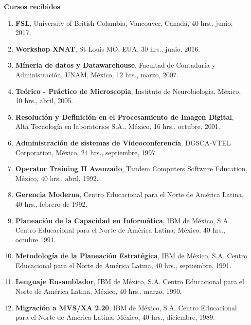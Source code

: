 \documentclass[11pt]{article}
\begin{document}
\textbf{\color{red} Cursos recibidos}

\begin{enumerate}
\item \textbf{FSL}, University of British Columbia, Vancouver, Canadá, 40 hrs., junio, 2017. 

\item \textbf{Workshop XNAT}, St Louis MO, EUA, 30 hrs., junio, 2016. 

\item \textbf{Míneria de datos y Datawarehouse}, Facultad de Contaduría y Administración, UNAM, México, 12 hrs., marzo, 2007.

\item \textbf{Teórico - Práctico de Microscopia}, Instituto de Neurobiología, México, 10 hrs., abril, 2005.

\item \textbf{Resolución y Definición en el Procesamiento de Imagen Digital}, Alta Tecnología en laboratorios S.A., México, 16 hrs., octubre, 2001.

\item \textbf{Administración de sistemas de Videoconferencia}, DGSCA-VTEL Corporation, México, 24 hrs., septiembre, 1997.

\item \textbf{Operator Training II Avanzado}, Tandem Computers Software Education, México, 40 hrs., abril,  1992.

\item \textbf{Gerencia Moderna}, Centro Educacional para el Norte de América Latina, 40 hrs., febrero de 1992.

\item \textbf{Planeación de la Capacidad en Informática}, IBM de México, S.A. Centro Educacional para el Norte de América Latina, México, 40 hrs., 
octubre 1991.

\item \textbf{Metodología de la Planeación Estratégica}, IBM de México, S.A. Centro Educacional para el Norte de América Latina, 40 hrs., septiembre, 1991.
 
\item \textbf{Lenguaje Ensamblador}, IBM de México, S.A. Centro Educacional para el Norte de América Latina, México, 40 hrs., marzo, 1990.
 
\item \textbf{Migración a MVS/XA 2.20}, IBM de México, S.A. Centro Educacional para el Norte de América Latina, México, 40 hrs., diciembre, 1989.


\end{enumerate}
\end{document}

